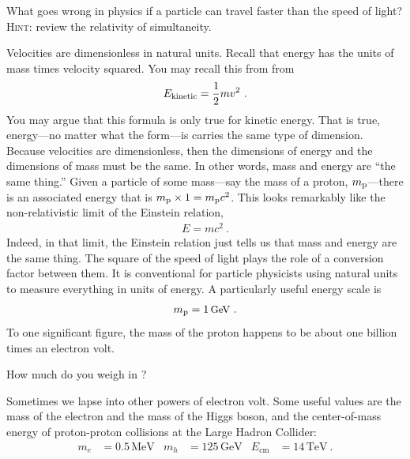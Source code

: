\documentclass[12pt, oneside]{report}    %
\begin{document}
\begin{exercise}
What goes wrong in physics if a particle can travel faster than the speed of light? \textsc{Hint}: review the relativity of simultaneity. 
\end{exercise}
Velocities are dimensionless in natural units. 
Recall that energy has the units of mass times velocity squared. You may recall this from from 
\begin{align}
    E_\textnormal{kinetic} = \frac{1}{2} mv^2 \ .
\end{align}
You may argue that this formula is only true for kinetic energy. That is true, energy---no matter what the form---is carries the same type of dimension. Because velocities are dimensionless, then the dimensions of energy and the dimensions of mass must be the same. In other words, mass and energy are ``the same thing.'' Given a particle of some mass---say the mass of a proton, $m_\textnormal{p}$---there is an associated energy that is $m_\textnormal{p} \times 1  = m_\textnormal{p} c^2$. This looks remarkably like the non-relativistic limit of the Einstein relation,
\begin{align}
    E = mc^2 \ .
\end{align}
Indeed, in that limit, the Einstein relation just tells us that mass and energy are the same thing. The square of the speed of light plays the role of a conversion factor between them. It is conventional for particle physicists using natural units to measure everything in units of energy. A particularly useful energy scale is 
\begin{align}
    m_\textnormal{p} = 1\,\textnormal{{\small{GeV}}{}} \ .
\end{align}
To one significant figure, the mass of the proton happens to be about one billion times an electron volt.  
\begin{exercise}
How much do you weigh in \GeV{}? 
\end{exercise}
Sometimes we lapse into other powers of electron volt. Some useful values are the mass of the electron and the mass of the Higgs boson, and the center-of-mass energy of proton-proton collisions at the Large Hadron Collider:
\begin{align}
    m_e &= 0.5\,\text{MeV}
    &
    m_h &= 125\,\text{GeV}
    &
    E_\text{cm} &= 14\,\text{TeV} \ .
\end{align}
\end{document}
